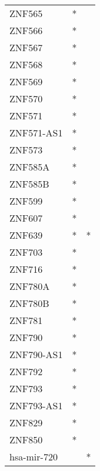 \begin{longtable}{lcc}
ZNF565           &              * &            \\
ZNF566           &              * &            \\
ZNF567           &              * &            \\
ZNF568           &              * &            \\
ZNF569           &              * &            \\
ZNF570           &              * &            \\
ZNF571           &              * &            \\
ZNF571-AS1       &              * &            \\
ZNF573           &              * &            \\
ZNF585A          &              * &            \\
ZNF585B          &              * &            \\
ZNF599           &              * &            \\
ZNF607           &              * &            \\
ZNF639           &              * &          * \\
ZNF703           &              * &            \\
ZNF716           &              * &            \\
ZNF780A          &              * &            \\
ZNF780B          &              * &            \\
ZNF781           &              * &            \\
ZNF790           &              * &            \\
ZNF790-AS1       &              * &            \\
ZNF792           &              * &            \\
ZNF793           &              * &            \\
ZNF793-AS1       &              * &            \\
ZNF829           &              * &            \\
ZNF850           &              * &            \\
hsa-mir-720      &                &          * \\
\end{longtable}
